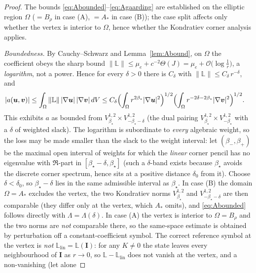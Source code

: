 \begin{proof}
    The bounds \eqref{eq:Abounded}--\eqref{eq:Agaarding} are established on the elliptic region $\Omega$ ($=B_\rho$ in
    case (A), $=A_*$ in case (B)); the case split affects only whether the vertex is interior to $\Omega$, hence whether
    the Kondratiev corner analysis applies.

    \emph{Boundedness.} By Cauchy--Schwarz and Lemma~\ref{lem:Abound}, on $\Omega$ the coefficient obeys the sharp bound
    $\|\mathbb{L}\|\le\mu_e+c^{-2}\Theta(J)=\mu_e+\mathcal{O}\!\big(\log\tfrac1r\big)$, a \emph{logarithm}, not a power.
    Hence for every $\delta>0$ there is $C_\delta$ with $\|\mathbb{L}\|\le C_\delta\,r^{-\delta}$, and
    \begin{align*}
        |a(\bm{u},\bm{v})|
         & \le \int_{\Omega} \|\mathbb{L}\|\,|\nabla\bm{u}|\,|\nabla\bm{v}|\,dV
        \le C_\delta \Big(\!\int_{\Omega} r^{2\beta_\star}|\nabla\bm{u}|^2\Big)^{1/2}
        \Big(\!\int_{\Omega} r^{-2\delta-2\beta_\star}|\nabla\bm{v}|^2\Big)^{1/2}.
    \end{align*}
    This exhibits $a$ as bounded from $V^{1,2}_{\beta_\star}\times V^{1,2}_{-\beta_\star-\delta}$ (the dual pairing
    $V^{1,2}_{\beta_\star}\times V^{1,2}_{-\beta_\star}$ with a $\delta$ of weighted slack). The logarithm is
    subordinate to \emph{every} algebraic weight, so the loss may be made smaller than the slack to the weight interval:
    let $(\beta_-,\beta_+)$ be the maximal open interval of weights for which the \emph{linear} corner pencil has no
    eigenvalue with $\Re$-part in $[\beta_\star-\delta,\beta_\star]$ (such a $\delta$-band exists because $\beta_\star$
    avoids the discrete corner spectrum, hence sits at a positive distance $\delta_0$ from it). Choose $\delta<\delta_0$,
    so $\beta_\star-\delta$ lies in the same admissible interval as $\beta_\star$. In case (B) the domain $\Omega=A_*$
    excludes the vertex, the two Kondratiev norms $V^{1,2}_{\beta_\star}$ and $V^{1,2}_{-\beta_\star-\delta}$ are then
    comparable (they differ only at the vertex, which $A_*$ omits), and \eqref{eq:Abounded} follows directly with
    $\Lambda=\Lambda(\delta)$. In case (A) the vertex is interior to $\Omega=B_\rho$ and the two norms are \emph{not}
    comparable there, so the same-space estimate is obtained by perturbation off a constant-coefficient symbol. The
    correct reference symbol at the vertex is \emph{not} $\mathbb{L}_{\mathrm{lin}}=\mathbb{L}(\bm{I})$: for any
    $K\neq0$ the state leaves every neighbourhood of $\bm{I}$ as $r\to0$, so
    $\mathbb{L}-\mathbb{L}_{\mathrm{lin}}$ does not vanish at the vertex, and a non-vanishing (let alone

\end{proof}
